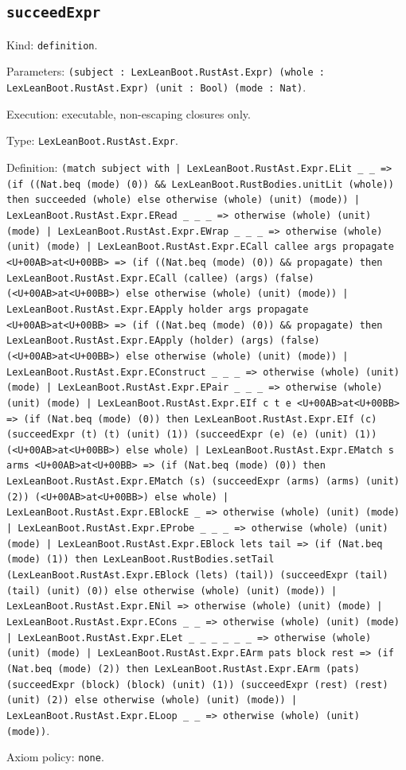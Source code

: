 \documentclass[11pt]{article}
\begin{document}
\subsection*{\texttt{succeedExpr}}
\noindent Kind: \texttt{definition}.\par
\noindent Parameters: \texttt{(subject : LexLeanBoot.RustAst.Expr) (whole : LexLeanBoot.RustAst.Expr) (unit : Bool) (mode : Nat)}.\par
\noindent Execution: executable, non-escaping closures only.\par
\noindent Type: \texttt{LexLeanBoot.RustAst.Expr}.\par
\noindent Definition: \texttt{(match subject with | LexLeanBoot.RustAst.Expr.ELit \_ \_ => (if ((Nat.beq (mode) (0)) \&\& LexLeanBoot.RustBodies.unitLit (whole)) then succeeded (whole) else otherwise (whole) (unit) (mode)) | LexLeanBoot.RustAst.Expr.ERead \_ \_ \_ => otherwise (whole) (unit) (mode) | LexLeanBoot.RustAst.Expr.EWrap \_ \_ \_ => otherwise (whole) (unit) (mode) | LexLeanBoot.RustAst.Expr.ECall callee args propagate <U+00AB>at<U+00BB> => (if ((Nat.beq (mode) (0)) \&\& propagate) then LexLeanBoot.RustAst.Expr.ECall (callee) (args) (false) (<U+00AB>at<U+00BB>) else otherwise (whole) (unit) (mode)) | LexLeanBoot.RustAst.Expr.EApply holder args propagate <U+00AB>at<U+00BB> => (if ((Nat.beq (mode) (0)) \&\& propagate) then LexLeanBoot.RustAst.Expr.EApply (holder) (args) (false) (<U+00AB>at<U+00BB>) else otherwise (whole) (unit) (mode)) | LexLeanBoot.RustAst.Expr.EConstruct \_ \_ \_ => otherwise (whole) (unit) (mode) | LexLeanBoot.RustAst.Expr.EPair \_ \_ \_ => otherwise (whole) (unit) (mode) | LexLeanBoot.RustAst.Expr.EIf c t e <U+00AB>at<U+00BB> => (if (Nat.beq (mode) (0)) then LexLeanBoot.RustAst.Expr.EIf (c) (succeedExpr (t) (t) (unit) (1)) (succeedExpr (e) (e) (unit) (1)) (<U+00AB>at<U+00BB>) else whole) | LexLeanBoot.RustAst.Expr.EMatch s arms <U+00AB>at<U+00BB> => (if (Nat.beq (mode) (0)) then LexLeanBoot.RustAst.Expr.EMatch (s) (succeedExpr (arms) (arms) (unit) (2)) (<U+00AB>at<U+00BB>) else whole) | LexLeanBoot.RustAst.Expr.EBlockE \_ => otherwise (whole) (unit) (mode) | LexLeanBoot.RustAst.Expr.EProbe \_ \_ \_ => otherwise (whole) (unit) (mode) | LexLeanBoot.RustAst.Expr.EBlock lets tail => (if (Nat.beq (mode) (1)) then LexLeanBoot.RustBodies.setTail (LexLeanBoot.RustAst.Expr.EBlock (lets) (tail)) (succeedExpr (tail) (tail) (unit) (0)) else otherwise (whole) (unit) (mode)) | LexLeanBoot.RustAst.Expr.ENil => otherwise (whole) (unit) (mode) | LexLeanBoot.RustAst.Expr.ECons \_ \_ => otherwise (whole) (unit) (mode) | LexLeanBoot.RustAst.Expr.ELet \_ \_ \_ \_ \_ \_ => otherwise (whole) (unit) (mode) | LexLeanBoot.RustAst.Expr.EArm pats block rest => (if (Nat.beq (mode) (2)) then LexLeanBoot.RustAst.Expr.EArm (pats) (succeedExpr (block) (block) (unit) (1)) (succeedExpr (rest) (rest) (unit) (2)) else otherwise (whole) (unit) (mode)) | LexLeanBoot.RustAst.Expr.ELoop \_ \_ => otherwise (whole) (unit) (mode))}.\par
\noindent Axiom policy: \texttt{none}.\par
\end{document}
